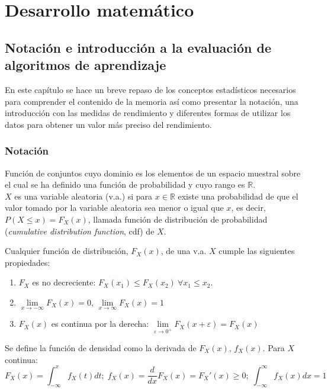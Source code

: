 \part{Desarrollo matemático}
\label{part:matematicas}

\chapter{Notación e introducción a la evaluación de algoritmos de aprendizaje}
\label{chapter:Intro}

	En este capítulo se hace un breve repaso de los 
conceptos estadísticos necesarios para comprender el 
contenido de la memoria así como presentar la notación,
una introducción con las medidas de rendimiento y 
diferentes formas de utilizar los datos para 
obtener un valor más preciso del rendimiento.

\section*{Notación}
	
\begin{definicion}
	Función de conjuntos cuyo dominio es los elementos de un 
espacio muestral sobre el cual se ha definido una función de
probabilidad y cuyo rango es $\mathbb{R}$.\\
	$X$ es una variable aleatoria (v.a.) si para $x \in 
\mathbb{R}$ existe una probabilidad de que el valor tomado 
por la variable aleatoria sea menor o igual que $x$, es
decir, $P(X \leq x) = F_X (x)$, llamada función de
distribución de probabilidad (\textit{cumulative distribution
function}, cdf) de $X$.	
\end{definicion}

	Cualquier función de distribución, $F_X(x)$, de una v.a.
$X$ cumple las siguientes propiedades:
 
\begin{enumerate}
	\item $F_X$ es no decreciente: 
			$F_X(x_1) \leq F_X(x_2) \ \forall x_1 \leq x_2$.
	\item $\underset{x \rightarrow -\infty}{\lim} F_X(x) =
			 0$,
			$\underset{x \rightarrow \infty}{\lim} F_X(x) =
			 1$
	\item $F_X(x)$ es continua por la derecha: 
		$\underset{\varepsilon \rightarrow 0^+}{\lim} 
		F_X(x+\varepsilon) = F_X(x)$
\end{enumerate}
	
\begin{definicion}
	Se define la función de densidad como la derivada de 
$F_X(x)$, $f_X(x)$. Para $X$ continua:
	\[ 
		F_X(x) = \int_{-\infty}^x f_X(t) dt; \;
		f_X(x) = \frac{d}{dx}F_X(x) = F_X'(x) \geq 0; \;
		\int_{-\infty}^{\infty} f_X(x) dx = 1 
	\]
\end{definicion}
	
